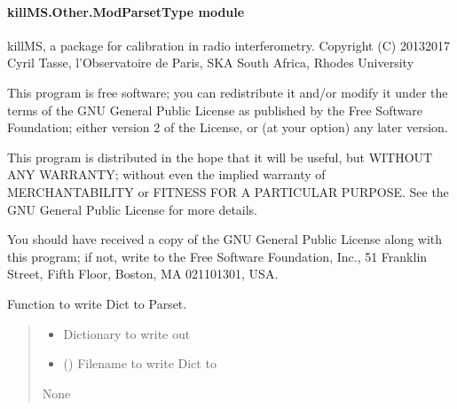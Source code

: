 \documentclass[letterpaper,10pt,english]{sphinxmanual}
\begin{document}
\paragraph{killMS.Other.ModParsetType module}
\label{\detokenize{api/killMS.Other:module-killMS.Other.ModParsetType}}\label{\detokenize{api/killMS.Other:killms-other-modparsettype-module}}
\sphinxAtStartPar
killMS, a package for calibration in radio interferometry.
Copyright (C) 2013\sphinxhyphen{}2017  Cyril Tasse, l’Observatoire de Paris,
SKA South Africa, Rhodes University

\sphinxAtStartPar
This program is free software; you can redistribute it and/or
modify it under the terms of the GNU General Public License
as published by the Free Software Foundation; either version 2
of the License, or (at your option) any later version.

\sphinxAtStartPar
This program is distributed in the hope that it will be useful,
but WITHOUT ANY WARRANTY; without even the implied warranty of
MERCHANTABILITY or FITNESS FOR A PARTICULAR PURPOSE.  See the
GNU General Public License for more details.

\sphinxAtStartPar
You should have received a copy of the GNU General Public License
along with this program; if not, write to the Free Software
Foundation, Inc., 51 Franklin Street, Fifth Floor, Boston, MA  02110\sphinxhyphen{}1301, USA.

\begin{fulllineitems}
\label{\detokenize{api/killMS.Other:killMS.Other.ModParsetType.DictToParset}}
\pysigstartsignatures
{}
\pysigstopsignatures
\sphinxAtStartPar
Function to write Dict to Parset.
\begin{quote}\begin{description}
\begin{itemize}
\item {} 
\sphinxAtStartPar
{} \textendash{} Dictionary to write out

\item {} 
\sphinxAtStartPar
{} () \textendash{} Filename to write Dict to

\end{itemize}

\sphinxAtStartPar
None

\end{description}\end{quote}

\end{fulllineitems}
\end{document}
